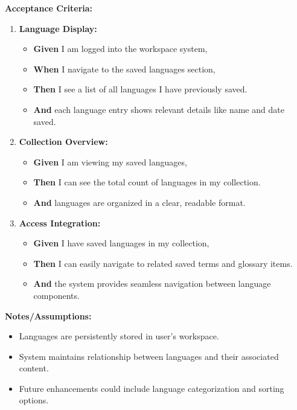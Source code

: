 \documentclass[12pt]{article}
\begin{document}
\vspace{1em}
\textbf{Acceptance Criteria:}
\begin{enumerate}
    \item \textbf{Language Display:}
    \begin{itemize}
        \item \textbf{Given} I am logged into the workspace system,
        \item \textbf{When} I navigate to the saved languages section,
        \item \textbf{Then} I see a list of all languages I have previously saved.
        \item \textbf{And} each language entry shows relevant details like name and date saved.
    \end{itemize}

    \item \textbf{Collection Overview:}
    \begin{itemize}
        \item \textbf{Given} I am viewing my saved languages,
        \item \textbf{Then} I can see the total count of languages in my collection.
        \item \textbf{And} languages are organized in a clear, readable format.
    \end{itemize}

    \item \textbf{Access Integration:}
    \begin{itemize}
        \item \textbf{Given} I have saved languages in my collection,
        \item \textbf{Then} I can easily navigate to related saved terms and glossary items.
        \item \textbf{And} the system provides seamless navigation between language components.
    \end{itemize}
\end{enumerate}

\vspace{1em}
\textbf{Notes/Assumptions:}
\begin{itemize}
    \item Languages are persistently stored in user's workspace.
    \item System maintains relationship between languages and their associated content.
    \item Future enhancements could include language categorization and sorting options.
\end{itemize}
\end{document}
